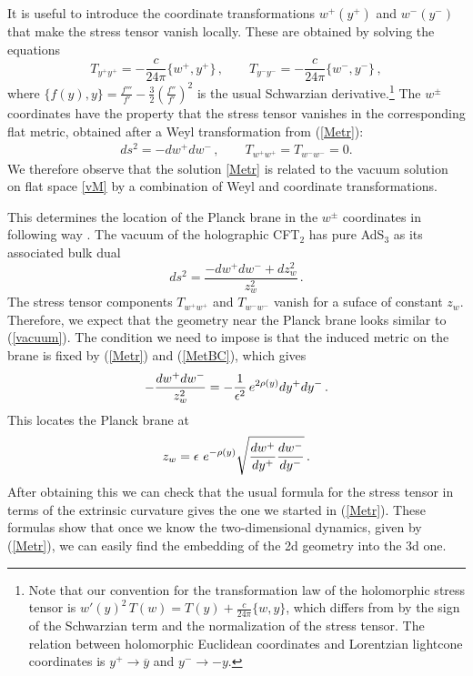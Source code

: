 \documentclass[12pt]{article}
\newcommand{\be}{\begin{equation}}
\newcommand{\ee}{\end{equation}}
\def\la{\label}
\def\nref#1{(\ref{#1})}
\begin{document}
It is useful to introduce the coordinate transformations $w^+(y^+)$ and $w^-(y^-)$ that make the stress tensor vanish locally.
These are obtained by solving the equations    
\be
 T_{y^+ y^+} = - { \frac{c}{24\pi} } \{ w^+ , y^+ \} \, ,
 \qquad T_{y^- y^-} = - { \frac{c}{24\pi} } \{ w^- , y^- \}
\, ,
\la{Coorwy}
\ee
where $\{f(y),y\} = \frac{f'''}{f'} - \frac{3}{2} \left(\frac{f''}{f'}\right)^2$ is the usual Schwarzian derivative.\footnote{Note that our convention for the transformation law of the holomorphic stress tensor is $w'(y)^2\, T(w) = T(y) + \frac{c}{24\pi}\{w,y\}$, which differs from \cite{Polchinski:1998rq} by the sign of the Schwarzian term and the normalization of the stress tensor. 
The relation between holomorphic Euclidean coordinates and Lorentzian lightcone coordinates is $y^+ \to \overline{y}$ and $y^- \to -y$.}
The $w^\pm$ coordinates have the property that the stress tensor vanishes in the corresponding flat metric, obtained after a Weyl transformation from (\ref{Metr}):
\begin{align}
ds^2 = - dw^+ dw^-\, , \qquad T_{w^+ w^+} = T_{w^- w^-} = 0. \label{vM}
\end{align}
We therefore observe that the solution \eqref{Metr} is related to the vacuum solution on flat space \eqref{vM} by a combination of Weyl and coordinate transformations.

This determines the location of the Planck brane in the $w^\pm$ coordinates in following way \cite{Banados:1998gg}. 
The vacuum of the holographic CFT$_2$ has pure AdS$_3$ as its associated bulk dual
\be 
\la{vacuum}
ds^2 = \frac{ -dw^+ dw^- + dz_w^2}{z_w^2} \, .
\ee
The stress tensor components $T_{w^+w^+}$ and $T_{w^-w^-}$ vanish for a suface of constant $z_w$.
Therefore, we expect that the geometry near the Planck brane looks similar to (\ref{vacuum}).
The condition we need to impose is that the induced metric on the brane is fixed by (\ref{Metr}) and (\ref{MetBC}), which gives
\begin{align}
- {dw^+ dw^- \over z_w^2}  = - \frac{1}{\epsilon^2} \, e^{2 \rho(y)} dy^+ dy^- \,.
\end{align}
This locates the Planck brane at 
\begin{align}
z_w  = \epsilon \ e^{-\rho(y)} \sqrt{{dw^+ \over dy^+} {dw^- \over dy^-}}\, .
\label{PlanckBr}
\end{align}
After obtaining this we can check that the usual formula for the stress tensor in terms of the extrinsic curvature \cite{Balasubramanian:1999re} gives the one we started in \nref{Metr}. 
These formulas show that once we know the two-dimensional dynamics, given by \nref{Metr}, we can easily find the embedding of the 2d geometry into the 3d one.
\end{document}
